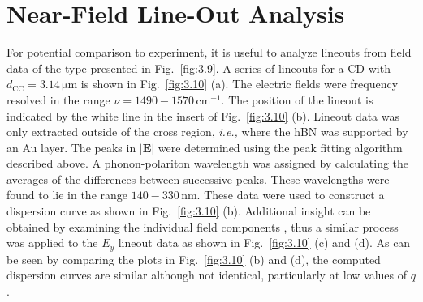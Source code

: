 \documentclass[preprint,
amsmath,amssymb,
aip,
jap,
floatfix,]{revtex4-2}
\begin{document}
		\section{Near-Field Line-Out Analysis}
		\label{sec:NFAII}
				For potential comparison to experiment, it is useful to analyze lineouts from field data of the type presented in Fig.~\ref{fig:3.9}. A series of lineouts for a CD with $d_\mathrm{CC} = 3.14 \, \si{\um}$ is shown in Fig.~\ref{fig:3.10} (a). The electric fields were frequency resolved in the range $\nu = 1490 - 1570 \, \mathrm{cm}^{-1}$. The position of the lineout is indicated by the white line in the insert of Fig.~\ref{fig:3.10} (b). Lineout data was only extracted outside of the cross region, \textit{i.e.,} where the hBN was supported by an Au layer. The peaks in $|\bm{E}|$ were determined using the peak fitting algorithm described above. A phonon-polariton wavelength was assigned by calculating the averages of the differences between successive peaks. These wavelengths were found to lie in the range $140 - 330 \, \si{\nm}$. These data were used to construct a dispersion curve as shown in Fig.~\ref{fig:3.10} (b). Additional insight can be obtained by examining the individual field components \cite{Klein:2014}, thus  a similar process was applied to the $E_y$ lineout data as shown in Fig.~\ref{fig:3.10} (c) and (d). As can be seen by comparing the plots in Fig.~\ref{fig:3.10} (b) and (d), the computed dispersion curves are similar although not identical, particularly at low values of $q$. 
\end{document}
